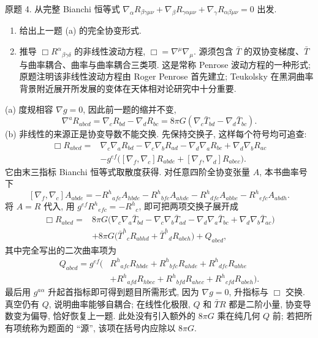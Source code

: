 \begin{exercise}\label{ps:8.4}
原题 4. 从完整 Bianchi 恒等式 $\nabla_\alpha R_{\beta\gamma\mu\nu}+\nabla_\beta R_{\gamma\alpha\mu\nu}+\nabla_\gamma R_{\alpha\beta\mu\nu}=0$ 出发.
\begin{enumerate}[label=(\alph*)]
\item 给出上一题 (a) 的完全协变形式.
\item 推导 $\Box R^\alpha{}_{\beta\gamma\delta}$ 的非线性波动方程, $\Box=\nabla^\mu\nabla_\mu$. 源须包含 $\bar T$ 的双协变梯度、$\bar T$ 与曲率耦合、曲率与曲率耦合三类项. 这是常称 Penrose 波动方程的一种形式; 原题注明该非线性波动方程由 Roger Penrose 首先建立; Teukolsky 在黑洞曲率背景附近展开所发展的变体在天体相对论研究中十分重要.
\end{enumerate}
\end{exercise}
\begin{solution}
(a) 度规相容 $\nabla g=0$, 因此前一题的缩并不变,
\[
\nabla^aR_{abcd}=\nabla_cR_{bd}-\nabla_dR_{bc}
=8\pi G(\nabla_c\bar T_{bd}-\nabla_d\bar T_{bc}).
\]
(b) 非线性的来源正是协变导数不能交换. 先保持交换子, 这样每个符号均可追查:
\begin{align*}
\Box R_{abcd}={}&\nabla_c\nabla_aR_{bd}-\nabla_c\nabla_bR_{ad}
-\nabla_d\nabla_aR_{bc}+\nabla_d\nabla_bR_{ac}\\
&-g^{ef}\bigl([\nabla_f,\nabla_c]R_{abde}+[\nabla_f,\nabla_d]R_{abec}\bigr).
\end{align*}
它由末三指标 Bianchi 恒等式取散度获得. 对任意四阶全协变张量 $A$, 本书曲率号下
\[
[\nabla_f,\nabla_c]A_{abde}
=-R^h{}_{afc}A_{hbde}-R^h{}_{bfc}A_{ahde}
-R^h{}_{dfc}A_{abhe}-R^h{}_{efc}A_{abdh}.
\]
将 $A=R$ 代入, 用 $g^{ef}R^h{}_{efc}=-R^h{}_c$, 即可把两项交换子展开成
\begin{align*}
\Box R_{abcd}={}&8\pi G\bigl(\nabla_c\nabla_a\bar T_{bd}-\nabla_c\nabla_b\bar T_{ad}
-\nabla_d\nabla_a\bar T_{bc}+\nabla_d\nabla_b\bar T_{ac}\bigr)\\
&+8\pi G\bigl(\bar T^h{}_cR_{abhd}+\bar T^h{}_dR_{abch}\bigr)+Q_{abcd},
\end{align*}
其中完全写出的二次曲率项为
\begin{align*}
Q_{abcd}=g^{ef}\bigl(&R^h{}_{afc}R_{hbde}+R^h{}_{bfc}R_{ahde}+R^h{}_{dfc}R_{abhe}\\
&+R^h{}_{afd}R_{hbec}+R^h{}_{bfd}R_{ahec}+R^h{}_{cfd}R_{abeh}\bigr).
\end{align*}
最后用 $g^{a\alpha}$ 升起首指标即可得到题目所需形式, 因为 $\nabla g=0$, 升指标与 $\Box$ 交换. 真空仍有 $Q$, 说明曲率能够自耦合; 在线性化极限, $Q$ 和 $\bar T R$ 都是二阶小量, 协变导数变为偏导, 恰好恢复上一题. 此处没有引入额外的 $8\pi G$ 乘在纯几何 $Q$ 前; 若把所有项统称为题面的 ``源'', 该项在括号内应除以 $8\pi G$.
\end{solution}

